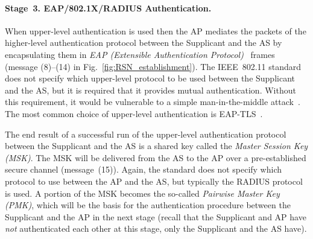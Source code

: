 \paragraph{Stage~3. EAP/802.1X/RADIUS Authentication.}
%

When upper-level authentication is used then the AP mediates the packets of the higher-level authentication protocol between the Supplicant and the AS by encapsulating them in \emph{EAP (Extensible Authentication Protocol)}~\cite{IETF:RFC3748:EAP} frames 
(message (8)--(14) in Fig.~\ref{fig:RSN_establishment}).
The IEEE~802.11 standard does not specify which upper-level protocol to be used between the Supplicant and the AS,
but it is required that it provides mutual authentication.
Without this requirement, it would be vulnerable to a simple man-in-the-middle attack~\cite{Asokan:2003:MitM-tunneling}.
The most common choice of upper-level authentication is EAP-TLS~\cite{IETF:2008:RFC5216-EAP-TLS}. 

The end result of a successful run of the upper-level authentication protocol between the Supplicant and the AS is a shared key called the \emph{Master Session Key (MSK)}.
The MSK will be delivered from the AS to the AP over a pre-established secure channel (message~(15)).
Again, the standard does not specify which protocol to use between the AP and the AS,
but typically the RADIUS protocol~\cite{IETF:RFC:2865-RADIUS} is used.
A portion of the MSK becomes the so-called \emph{Pairwise Master Key (PMK)},
which will be the basis for the authentication procedure between the Supplicant and the AP in the next stage 
(recall that the Supplicant and AP have \emph{not} authenticated each other at this stage, 
only the Supplicant and the AS have).



